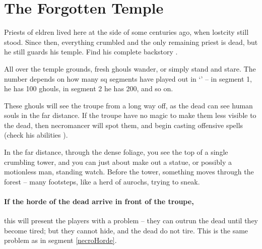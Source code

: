 \section[the Forgotten Temple]{The Forgotten Temple}
\label{necromancers_lair}

\begin{multicols}{2}


\noindent
Priests of \gls{eldren} lived here at the side of  some centuries ago, when \gls{lostcity} still stood.
Since then, everything crumbled and the only remaining priest is dead, but he still guards his temple.
Find his complete backstory .

All over the temple grounds, fresh ghouls wander, or simply stand and stare.
The number depends on how many \gls{sq} \glspl{segment} have played out in `' -- in \gls{segment} 1, he has 100 ghouls, in \gls{segment} 2 he has 200, and so on.

These ghouls will see the troupe from a long way off, as the dead can see human souls in the far distance.
If the troupe have no magic to make them less visible to the dead, then \gls{necromancer} will spot them, and begin \gls{casting} offensive spells (check his abilities ).

\begin{boxtext}
  In the far distance, through the dense foliage, you see the top of a single crumbling tower, and you can just about make out a statue, or possibly a motionless man, standing watch.
  Before the tower, something moves through the forest -- many footsteps, like a herd of aurochs, trying to sneak.
\end{boxtext}

\paragraph{If the horde of the dead arrive in front of the troupe,}
this will present the players with a problem -- they can outrun the dead until they become tired; but they cannot hide, and the dead do not tire.
This is the same problem as in \gls{segment} \vref{necroHorde}.


\end{multicols}
